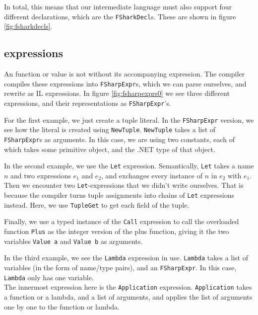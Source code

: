 In total, this means that our intermediate language must also support four
different declarations, which are the \texttt{FSharkDecl}s. These are shown in
figure \ref{fig:fsharkdecls}.

\subsection{\fsharp{} expressions}
\label{sec:fsharpexprs}
An \fsharp{} function or value is not without its accompanying \fsharp{}
expression. The \fsharp{} compiler compiles these \fsharp{} expressions into
\texttt{FSharpExpr}s, which we can parse ourselves, and rewrite as \fshark{}IL expressions.
In figure \ref{fig:fsharpexprs0} we see three different \fsharp{} expressions,
and their representations as \texttt{FSharpExpr}'s.

For the first example, we just create a tuple literal. In the
\texttt{FSharpExpr} version, we see how the literal is created using
\texttt{NewTuple}. \texttt{NewTuple} takes a list of \texttt{FSharpExpr}s as
arguments. In this case, we are using two constants, each of which takes some
primitive object, and the .NET type of that object.

In the second example, we use the \texttt{Let} expression. Semantically, \texttt{Let} takes a
name $n$ and two expressions $e_1$ and $e_2$, and exchanges every instance of
$n$ in $e_2$ with $e_1$.
Then we encounter two \texttt{Let}-expressions that we didn't write ourselves.
That is because the \fsharp{} compiler turns tuple assignments into chains of
\texttt{Let} expressions instead. Here, we use \texttt{TupleGet} to get each
field of the tuple.

Finally, we use a typed instance of the \texttt{Call} expression to call the
overloaded function \texttt{Plus} as the integer version of the plus function,
giving it the two variables \texttt{Value a} and \texttt{Value b} as arguments.

In the third example, we see the \texttt{Lambda} expression in use. \texttt{Lambda} takes
a list of variables (in the form of name/type pairs), and an \texttt{FSharpExpr}. In this case,
\texttt{Lambda} only has one variable.\\
The innermost expression here is the \texttt{Application} expression.
\texttt{Application} takes a function or a lambda, and a list of arguments, and
applies the list of arguments one by one to the function or lambda.

